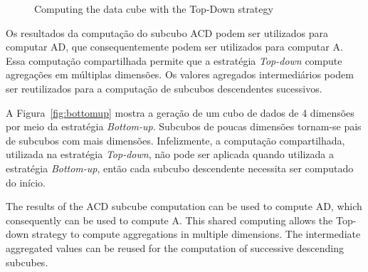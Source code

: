\begin{figure}[!hbt]
  \caption{Computing the data cube with the Top-Down strategy}\label{fig:topdown}
  \vspace{4mm}
  \begin{center}
  \end{center}
  \vspace{2mm}
  \legenda{}
\end{figure}

Os resultados da computação do subcubo ACD podem ser utilizados para computar AD, que consequentemente podem ser utilizados para computar A.
Essa computação compartilhada permite que a estratégia \textit{Top-down} compute agregações em múltiplas dimensões.
Os valores agregados intermediários podem ser reutilizados para a computação de subcubos descendentes sucessivos.

A Figura~\ref{fig:bottomup} mostra a geração de um cubo de dados de 4 dimensões por meio da estratégia \textit{Bottom-up}.
Subcubos de poucas dimensões tornam-se pais de subcubos com mais dimensões.
Infelizmente, a computação compartilhada, utilizada na estratégia \textit{Top-down}, não pode ser aplicada quando utilizada a estratégia \textit{Bottom-up}, então cada subcubo descendente necessita ser computado do início.

The results of the ACD subcube computation can be used to compute AD, which consequently can be used to compute A.
This shared computing allows the Top-down strategy to compute aggregations in multiple dimensions.
The intermediate aggregated values can be reused for the computation of successive descending subcubes.

